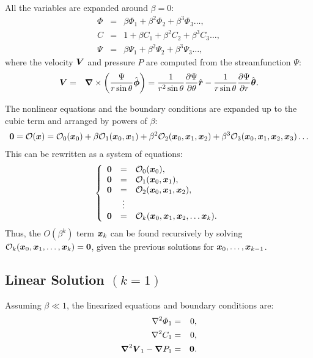All the variables are expanded around $\beta = 0$:
\begin{eqnarray}
\varPhi &=& \beta \varPhi_1 + \beta^2 \varPhi_2 + \beta^3 \varPhi_3 \ldots, \\
C &=& 1 + \beta C_1 + \beta^2 C_2 + \beta^3 C_3 \ldots, \\
\Psi &=& \beta \Psi_1 + \beta^2 \Psi_2 + \beta^3 \Psi_3 \ldots ,
\end{eqnarray}
where the velocity $\bV$ and pressure $P$ are computed from the streamfunction $\Psi$:
\begin{eqnarray}
\bV &=& \bnabla \times \pars{\frac{\Psi}{r \sin\theta} \bphihat} 
= \frac{1}{r^2 \sin\theta} \deriv{\Psi}{\theta} \brhat 
- \frac{1}{r \sin\theta} \deriv{\Psi}{r} \bthetahat.
\end{eqnarray}

The nonlinear equations and the boundary conditions are expanded up to the cubic term
and arranged by powers of $\beta$:
\begin{eqnarray}
\bzero = \cO(\bx) = \cO_0(\bx_0) 
   + \beta \cO_1(\bx_0, \bx_1) 
 + \beta^2 \cO_2(\bx_0, \bx_1, \bx_2) 
 + \beta^3 \cO_3(\bx_0, \bx_1, \bx_2, \bx_3) \ldots
\end{eqnarray}
This can be rewritten as a system of equations:
\begin{eqnarray}
\brc{rcl}{
\bzero &=& \cO_0(\bx_0), \\
\bzero &=& \cO_1(\bx_0, \bx_1), \\
\bzero &=& \cO_2(\bx_0, \bx_1, \bx_2), \\
& \vdots & \\
\bzero &=& \cO_k(\bx_0, \bx_1, \bx_2, \ldots \bx_k).
}
\end{eqnarray}
Thus, the $O(\beta^k)$ term $\bx_k$ can be found recursively by solving 
$\cO_k(\bx_0, \bx_1, \ldots, \bx_k) = \bzero$,
given the previous solutions for $\bx_0, \ldots, \bx_{k-1}$.

\subsection{Linear Solution $(k=1)$}

Assuming $\beta \ll 1$, the linearized equations and boundary conditions are:
\begin{eqnarray}
\Laplacian \varPhi_1 &=& 0, \\
\Laplacian C_1 &=& 0, \\
\bLaplacian \bV_1 - \bnabla P_1 &=& \bzero.
\end{eqnarray}

